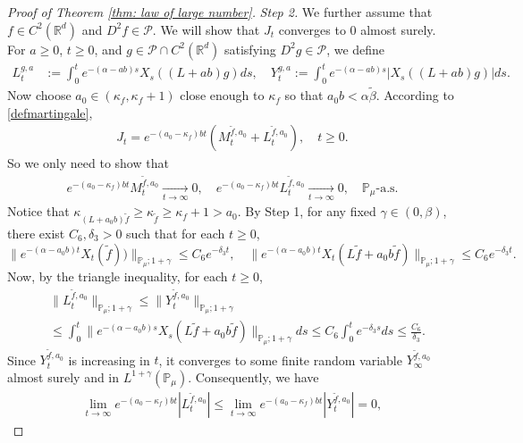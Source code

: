 \documentclass[12pt,a4paper]{amsart}
\theoremstyle{plain}
\theoremstyle{definition}
\numberwithin{equation}{section}
\begin{document}
\begin{proof}[Proof of Theorem \ref{thm: law of large number}]
  \emph{Step 2.}
  We further assume that $f\in C^2(\mathbb R^d)$ and $D^2f \in \mathcal{P}$.
  We will show that $J_t$ converges to $0$ almost surely.
  For $a \geq 0$, $ t\geq 0$, and $g\in \mathcal{P}\cap C^2(\mathbb{R}^d)$ satisfying $D^2g\in \mathcal{P}$, we define
  \begin{align}
    L_t^{g,a}
    & :=\int_0^t e^{-(\alpha-ab)s}X_s((L+ab)g) ds,
    \quad
    Y_t^{g,a}
    :=\int_0^t e^{-(\alpha-ab)s}|X_s((L+ab)g)|ds.
  \end{align}
  Now choose $a_0 \in (\kappa_{f}, \kappa_f + 1)$ close enough to $\kappa_f$ so that $a_0 b < \alpha \tilde \beta$.
  According to \eqref{defmartingale},
  \begin{align}
    J_t
    = e^{-(a_0-\kappa_f)bt} (M_t^{\widetilde{f}, a_0}+L_t^{\widetilde{f}, a_0}),
    \quad t\geq 0.
  \end{align}
  So we only need to show that
  \begin{align}
    e^{-(a_0-\kappa_f)b t}M_t^{\widetilde{f},a_0}
    \xrightarrow[t\to \infty]{} 0,
    \quad e^{-(a_0-\kappa_f)b t}L_t^{\widetilde{f},a_0}
    \xrightarrow[t\to \infty]{} 0,
    \quad \mathbb{P}_{\mu}\text{-a.s.}
  \end{align}
  Notice that $\kappa_{(L+a_0 b)\widetilde{f}}\geq \kappa_{\widetilde{f}}\geq \kappa_f+1 > a_0$.
  By Step 1, for any fixed $\gamma\in (0,\beta)$, there exist $C_6, \delta_3>0$ such that for each $t\geq 0$,
  \[
    \| e^{-(\alpha-a_0 b)t}X_t(\widetilde{f}))\|_{\mathbb{P}_{\mu};1+\gamma}
    \leq C_6 e^{-\delta_3 t},
    \quad \|e^{-(\alpha-a_0 b)t}X_t(L\widetilde{f}+a_0 b\widetilde{f})\|_{\mathbb{P}_{\mu};1+\gamma}
    \leq C_6 e^{-\delta_3 t}.
  \]
  Now, by the triangle inequality, for each $t\geq 0$,
  \begin{align}
    & \|L_t^{\widetilde{f},a_0}\|_{\mathbb{P}_{\mu};1+\gamma}
      \leq\|Y_t^{\widetilde{f},a_0}\|_{\mathbb{P}_{\mu};1+\gamma} \\
    & \leq \int_0^t \|e^{-(\alpha-a_0 b)s}X_s( L\widetilde{f}+a_0 b\widetilde{f})\|_{\mathbb{P}_{\mu};1+\gamma}ds\leq C_6 \int_0^t e^{-\delta_3 s}ds\leq\frac{C_6}{\delta_3}.
  \end{align}
  Since $Y_t^{\widetilde{f},a_0}$ is increasing in $t$, it converges to some finite random variable $Y_{\infty}^{\widetilde{f},a_0}$ almost surely and in $L^{1+\gamma}(\mathbb{P}_{\mu})$.
  Consequently,  we have
  \begin{align}
    \lim_{t\rightarrow \infty}e^{-(a_0 - \kappa_f)bt}|L_t^{\widetilde{f},a_0}|
    \leq  \lim_{t\rightarrow \infty}e^{-(a_0 - \kappa_f)bt}|Y_t^{\widetilde{f},a_0}|=0,

\end{align}
\end{proof}
\end{document}
